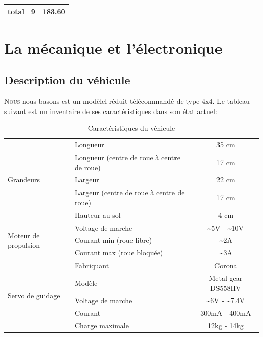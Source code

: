 \documentclass[a4paper,12pt]{report}
\begin{document}
{\begin{table}
\begin{tabular}{| l | c | r |}
\hline
\hline
total & 9& 183.60\\
\hline

\end{tabular}
\end{table}
\chapter{La mécanique et l'électronique}


\section{Description du véhicule \label{TableDesc}}
\lettrine{N}{ous} nous basons est un modèlel r\'eduit
t\'el\'ecommand\'e de type 4x4. Le tableau suivant est un inventaire de 
ses caractéristiques dans son \'etat actuel:
\begin{table}[h!]
\begin{center}
  \begin{tabular}{|p{4cm}|p{4cm}|c|}
    \hline
    \multirow{5}{*}{Grandeurs}
    &Longueur & 35 cm \\ \cline{2-3}
    &Longueur (centre de roue \`a centre de roue)& 17 cm \\ \cline{2-3}
    &Largeur & 22 cm \\ \cline{2-3}
    &Largeur (centre de roue \`a centre de roue) & 17 cm \\ \cline{2-3}
    & Hauteur au sol & 4 cm\\ \hline
    \multirow{3}{*}{Moteur de propulsion}
    & Voltage de marche & \~{}5V - \~{}10V  \\ \cline{2-3}
    & Courant min (roue libre) & \~{}2A \\ \cline{2-3}
    & Courant max (roue bloqu\'ee) & \~{}3A \\ \hline
    \multirow{5}{*}{Servo de guidage}
    & Fabriquant & Corona \\ \cline{2 - 3}
    & Modèle & Metal gear DS558HV\\ \cline{2-3}
    & Voltage de marche & \~{}6V - \~{}7.4V  \\ \cline{2-3}
    & Courant & 300mA - 400mA \\ \cline{2-3}
    & Charge maximale & 12kg - 14kg \\  
 \hline
	\end{tabular}
\end{center}
\caption{Caractéristiques du véhicule}
\end{table}
}
\end{document}
